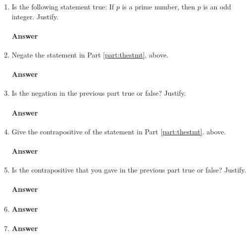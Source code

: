 \collab{\todo{}}

\begin{enumerate}
    \item Is the following statement true: If $p$ is a prime number, then $p$ is an odd
        integer. Justify.\label{part:thestmt}
        \paragraph{Answer}
        \todo{}

    \item Negate the statement in Part \ref{part:thestmt}. above.
        \paragraph{Answer}
        \todo{}

    \item Is the negation in the previous part true or false? Justify.
        \paragraph{Answer}
        \todo{}

    \item Give the contrapositive of the statement in Part \ref{part:thestmt}. above.
        \paragraph{Answer}
        \todo{}

    \item Is the contrapositive that you gave in the previous part true or
        false? Justify.
        \paragraph{Answer}
        \todo{}

    \item \todo{}
        \paragraph{Answer}
        \todo{}

    \item \todo{}
        \paragraph{Answer}
        \todo{}


\end{enumerate}
